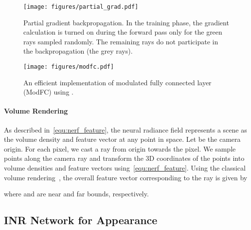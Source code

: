 \documentclass[10pt,twocolumn,letterpaper]{article}
\begin{document}
\begin{figure*}[!t]
  \centering
  \begin{minipage}[t]{0.68\linewidth}
    \begin{center}
\texttt{[image: figures/partial\_grad.pdf]}
    \end{center}
    \vspace{-0.6cm}
    \caption{Partial gradient backpropagation. In the training phase, the gradient calculation is turned on during the forward pass only for the green rays sampled randomly. The remaining rays do not participate in the backpropagation (the grey rays).}
    \vspace{-0.4cm}
    \label{fig:partial_grad}
  \end{minipage}\hspace{0.002\linewidth}
  \vline
  \hspace{0.005\linewidth}
  \centering
  \begin{minipage}[t]{0.3\linewidth}
    \centering
    \texttt{[image: figures/modfc.pdf]}
    \vspace{-0.7cm}
    \caption{An efficient implementation of modulated fully connected layer (ModFC) using .}
    \vspace{-1cm}
    \label{fig:modfc}
  \end{minipage}
\end{figure*}



\paragraph{Volume Rendering}
As described in~\cref{equ:nerf_feature}, the neural radiance field represents a scene as the volume density  and feature vector  at any point in space. Let  be the camera origin. For each pixel, we cast a ray  from origin  towards the pixel. We sample points along the camera ray  and transform the 3D coordinates of the points into volume densities and feature vectors using~\cref{equ:nerf_feature}. Using the classical volume rendering~\cite{kajiya1984Ray}, the overall feature vector  corresponding to the ray  is given by

where  and  are near and far bounds, respectively.





\subsection{INR Network for Appearance}
\label{sec:deep_inr}
\end{document}
